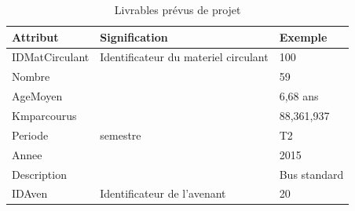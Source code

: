 \documentclass[a4paper]{report}
\begin{document}
\begin{doublespace}
	\begin{table}[H]
		\begin{center}
			\begin{tabularx}{17.5cm}{|X|X|X|}
				\hline
				\textbf{Attribut} & \textbf{Signification}               &
				\textbf{Exemple}                                                        \\
				\hline
				IDMatCirculant    & Identificateur du materiel circulant &
				100                                                                     \\
				\hline
				Nombre            &                                      & 59           \\
				\hline
				AgeMoyen          &                                      & 6,68 ans     \\
				\hline
				Kmparcourus       &                                      & 88,361,937   \\
				\hline
				Periode           & semestre                             & T2           \\
				\hline
				Annee             &                                      & 2015         \\
				\hline
				Description       &                                      & Bus standard \\
				\hline
				IDAven            & Identificateur de l'avenant          & 20           \\
				\hline
			\end{tabularx}
			\caption{Livrables prévus de projet}
		\end{center}
	\end{table}


\end{doublespace}
\end{document}
